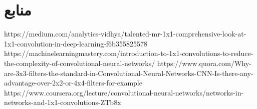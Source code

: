 \documentclass{article}
\begin{document}
\section*{منابع}
\renewcommand{\section}[2]{}%
\begin{thebibliography}{99} %


\begin{LTRitems}

\resetlatinfont

 https://medium.com/analytics-vidhya/talented-mr-1x1-comprehensive-look-at-1x1-convolution-in-deep-learning-f6b355825578
 https://machinelearningmastery.com/introduction-to-1x1-convolutions-to-reduce-the-complexity-of-convolutional-neural-networks/
 https://www.quora.com/Why-are-3x3-filters-the-standard-in-Convolutional-Neural-Networks-CNN-Is-there-any-advantage-over-2x2-or-4x4-filters-for-example
 https://www.coursera.org/lecture/convolutional-neural-networks/networks-in-networks-and-1x1-convolutions-ZTb8x

\end{LTRitems}

\end{thebibliography}
\end{document}

